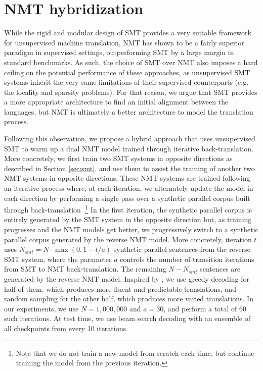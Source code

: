 \documentclass[11pt,a4paper]{article}
\begin{document}
\section{NMT hybridization}
\label{sec:nmt}

While the rigid and modular design of SMT provides a very suitable framework for unsupervised machine translation, NMT has shown to be a fairly superior paradigm in supervised settings, outperforming SMT by a large margin in standard benchmarks. As such, the choice of SMT over NMT also imposes a hard ceiling on the potential performance of these approaches, as unsupervised SMT systems inherit the very same limitations of their supervised counterparts (e.g. the locality and sparsity problems). For that reason, we argue that SMT provides a more appropriate architecture to find an initial alignment between the languages, but NMT is ultimately a better architecture to model the translation process.

Following this observation, we propose a hybrid approach that uses unsupervised SMT to warm up a dual NMT model trained through iterative back-translation. More concretely, we first train two SMT systems in opposite directions as described in Section \ref{sec:smt}, and use them to assist the training of another two NMT systems in opposite directions. These NMT systems are trained following an iterative process where, at each iteration, we alternately update the model in each direction by performing a single pass over a synthetic parallel corpus built through back-translation \citep{sennrich2016improving}.\footnote{Note that we do not train a new model from scratch each time, but continue training the model from the previous iteration.} In the first iteration, the synthetic parallel corpus is entirely generated by the SMT system in the opposite direction but, as training progresses and the NMT models get better, we progressively switch to a synthetic parallel corpus generated by the reverse NMT model. More concretely, iteration $t$ uses $N_{smt} = N \cdot \max (0, 1 - t / a)$ synthetic parallel sentences from the reverse SMT system, where the parameter $a$ controls the number of transition iterations from SMT to NMT back-translation. The remaining $N - N_{smt}$ sentences are generated by the reverse NMT model. Inspired by \citet{edunov2018understanding}, we use greedy decoding for half of them, which produces more fluent and predictable translations, and random sampling for the other half, which produces more varied translations.
In our experiments, we use $N=1,000,000$ and $a=30$, and perform a total of 60 such iterations. At test time, we use beam search decoding with an ensemble of all checkpoints from every 10 iterations.
\end{document}
